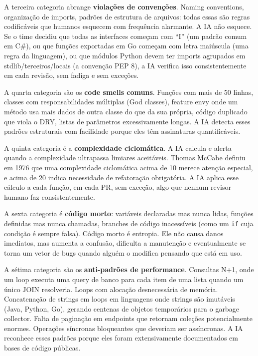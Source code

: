 A terceira categoria abrange \textbf{violações de convenções}. Naming conventions,
organização de imports, padrões de estrutura de arquivos: todas essas são regras
codificáveis que humanos esquecem com frequência alarmante. A IA não esquece. Se o
time decidiu que todas as interfaces começam com ``I'' (um padrão comum em C\#), ou
que funções exportadas em Go começam com letra maiúscula (uma regra da linguagem),
ou que módulos Python devem ter imports agrupados em stdlib/terceiros/locais (a
convenção PEP 8), a IA verifica isso consistentemente em cada revisão, sem fadiga
e sem exceções.

A quarta categoria são os \textbf{code smells comuns}. Funções com mais de 50 linhas,
classes com responsabilidades múltiplas (God classes), feature envy onde um método
usa mais dados de outra classe do que da sua própria, código duplicado que viola o
DRY, listas de parâmetros excessivamente longas. A IA detecta esses padrões
estruturais com facilidade porque eles têm assinaturas quantificáveis.

A quinta categoria é a \textbf{complexidade ciclomática}. A IA calcula e alerta
quando a complexidade ultrapassa limiares aceitáveis. Thomas McCabe definiu em 1976
que uma complexidade ciclomática acima de 10 merece atenção especial, e acima de 20
indica necessidade de refatoração obrigatória. A IA aplica esse cálculo a cada
função, em cada PR, sem exceção, algo que nenhum revisor humano faz
consistentemente.

A sexta categoria é \textbf{código morto}: variáveis declaradas mas nunca lidas,
funções definidas mas nunca chamadas, branches de código inacessíveis (como um
\texttt{if} cuja condição é sempre falsa). Código morto é entropia. Ele não causa
danos imediatos, mas aumenta a confusão, dificulta a manutenção e eventualmente
se torna um vetor de bugs quando alguém o modifica pensando que está em uso.

A sétima categoria são os \textbf{anti-padrões de performance}. Consultas N+1, onde
um loop executa uma query de banco para cada item de uma lista quando um único JOIN
resolveria. Loops com alocação desnecessária de memória. Concatenação de strings em
loops em linguagens onde strings são imutáveis (Java, Python, Go), gerando centenas
de objetos temporários para o garbage collector. Falta de paginação em endpoints que
retornam coleções potencialmente enormes. Operações síncronas bloqueantes que deveriam
ser assíncronas. A IA reconhece esses padrões porque eles foram extensivamente
documentados em bases de código públicas.

